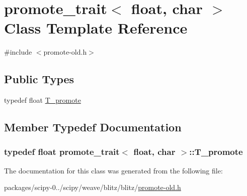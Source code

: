 \hypertarget{classpromote__trait_3_01float_00_01char_01_4}{}\section{promote\+\_\+trait$<$ float, char $>$ Class Template Reference}
\label{classpromote__trait_3_01float_00_01char_01_4}


{\ttfamily \#include $<$promote-\/old.\+h$>$}

\subsection*{Public Types}
\begin{DoxyCompactItemize}
\item 
typedef float \hyperlink{classpromote__trait_3_01float_00_01char_01_4_aae84b53764a6d3723d563729b1e0cd02}{T\+\_\+promote}
\end{DoxyCompactItemize}


\subsection{Member Typedef Documentation}
\hypertarget{classpromote__trait_3_01float_00_01char_01_4_aae84b53764a6d3723d563729b1e0cd02}{}
\subsubsection[{T\+\_\+promote}]{\setlength{\rightskip}{0pt plus 5cm}typedef float {\bf promote\+\_\+trait}$<$ float, char $>$\+::{\bf T\+\_\+promote}}\label{classpromote__trait_3_01float_00_01char_01_4_aae84b53764a6d3723d563729b1e0cd02}


The documentation for this class was generated from the following file\+:\begin{DoxyCompactItemize}
\item 
packages/scipy-\/0../scipy/weave/blitz/blitz/\hyperlink{promote-old_8h}{promote-\/old.\+h}\end{DoxyCompactItemize}
